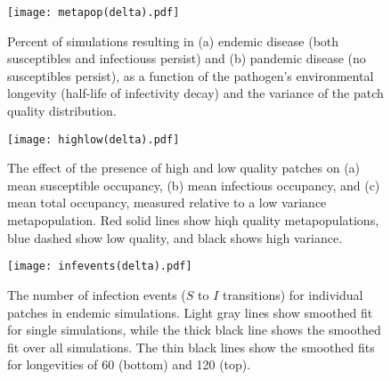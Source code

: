 \documentclass{svjour3}
\begin{document}
\begin{figure}[h!]
\centering
\texttt{[image: metapop(delta).pdf]}
\caption{Percent of simulations resulting in (a) endemic disease (both susceptibles and infectiouss persist) and (b) pandemic disease (no susceptibles persist), as a function of the pathogen's environmental longevity (half-life of infectivity decay) and the variance of the patch quality distribution.}
\label{poutcome_delta}
\end{figure}   

\begin{figure}
\centering
\texttt{[image: highlow(delta).pdf]}
\caption{The effect of the presence of high and low quality patches on (a) mean susceptible occupancy, (b) mean infectious occupancy, and (c) mean total occupancy, measured relative to  a low variance metapopulation.  Red solid lines show hiqh quality metapopulations, blue dashed show low quality, and black shows high variance.}
\label{sens_delta}
\end{figure}

\begin{figure}
\centering
\texttt{[image: infevents(delta).pdf]}
\caption{The number of infection events ($S$ to $I$ transitions) for individual patches in endemic simulations.  Light gray lines show smoothed fit for single simulations, while the thick black line shows the smoothed fit over all simulations.  The thin black lines show the smoothed fits for longevities of 60 (bottom) and 120 (top).}
\label{infections_delta}
\end{figure}

\clearpage

     
\end{document}
